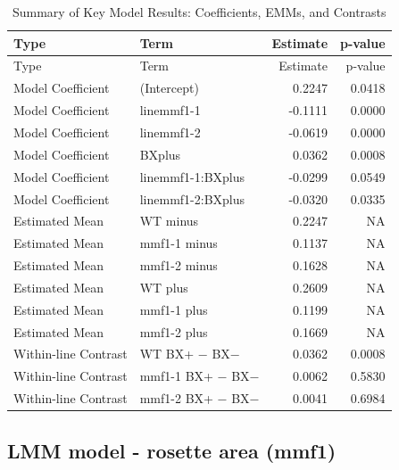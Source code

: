 \documentclass[
  10pt,
]{article}
\begin{document}
\begin{longtable}[]{@{}llrr@{}}
\caption{Summary of Key Model Results: Coefficients, EMMs, and
Contrasts}\tabularnewline
\toprule\noalign{}
Type & Term & Estimate & p-value \\
\midrule\noalign{}
\endfirsthead
\toprule\noalign{}
Type & Term & Estimate & p-value \\
\midrule\noalign{}
\endhead
\bottomrule\noalign{}
\endlastfoot
Model Coefficient & (Intercept) & 0.2247 & 0.0418 \\
Model Coefficient & linemmf1-1 & -0.1111 & 0.0000 \\
Model Coefficient & linemmf1-2 & -0.0619 & 0.0000 \\
Model Coefficient & BXplus & 0.0362 & 0.0008 \\
Model Coefficient & linemmf1-1:BXplus & -0.0299 & 0.0549 \\
Model Coefficient & linemmf1-2:BXplus & -0.0320 & 0.0335 \\
Estimated Mean & WT minus & 0.2247 & NA \\
Estimated Mean & mmf1-1 minus & 0.1137 & NA \\
Estimated Mean & mmf1-2 minus & 0.1628 & NA \\
Estimated Mean & WT plus & 0.2609 & NA \\
Estimated Mean & mmf1-1 plus & 0.1199 & NA \\
Estimated Mean & mmf1-2 plus & 0.1669 & NA \\
Within-line Contrast & WT BX+ − BX− & 0.0362 & 0.0008 \\
Within-line Contrast & mmf1-1 BX+ − BX− & 0.0062 & 0.5830 \\
Within-line Contrast & mmf1-2 BX+ − BX− & 0.0041 & 0.6984 \\
\end{longtable}

\subsection{}\label{section}

\newpage

\subsection{LMM model - rosette area
(mmf1)}\label{lmm-model---rosette-area-mmf1}
\end{document}
